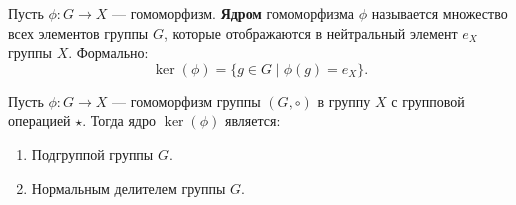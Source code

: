 \begin{shdef}
    \begin{definition}
    \leavevmode \nl 
    
        Пусть \( \phi: G \to X \) — гомоморфизм. \textbf{Ядром} гомоморфизма \( \phi \) называется множество всех элементов группы \( G \), которые отображаются в нейтральный элемент \( e_X \) группы \( X \). Формально:
        \[
        \ker(\phi) = \{ g \in G \mid \phi(g) = e_X \}.
        \]
    \end{definition}
\end{shdef}

\begin{shth}
    \begin{theorem}
        Пусть \( \phi: G \to X \) — гомоморфизм группы \( (G, \circ) \) в группу \( X \) с групповой операцией \( \star \). Тогда ядро \( \ker(\phi) \) является:
        \begin{enumerate}
            \item Подгруппой группы \( G \).
            \item Нормальным делителем группы \( G \).
        \end{enumerate}
    \end{theorem}
\end{shth}


